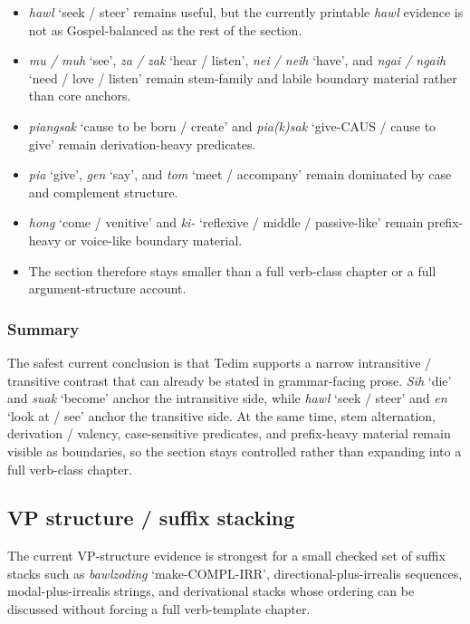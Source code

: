 \documentclass[
  11pt,
  a4paper,
]{article}
\providecommand{\tightlist}{%
  \setlength{\itemsep}{0pt}\setlength{\parskip}{0pt}}
\newcommand{\tdim}[1]{\textit{#1}}
\newcommand{\glossquote}[1]{`#1'}
\begin{document}
\begin{itemize}
\tightlist
\item
  \tdim{hawl} \glossquote{seek / steer} remains useful, but the
  currently printable \tdim{hawl} evidence is not as Gospel-balanced as
  the rest of the section.
\item
  \tdim{mu / muh} \glossquote{see}, \tdim{za / zak}
  \glossquote{hear / listen}, \tdim{nei / neih} \glossquote{have}, and
  \tdim{ngai / ngaih} \glossquote{need / love / listen} remain
  stem-family and labile boundary material rather than core anchors.
\item
  \tdim{piangsak} \glossquote{cause to be born / create} and
  \tdim{pia(k)sak} \glossquote{give-CAUS / cause to give} remain
  derivation-heavy predicates.
\item
  \tdim{pia} \glossquote{give}, \tdim{gen} \glossquote{say}, and
  \tdim{tom} \glossquote{meet / accompany} remain dominated by case and
  complement structure.
\item
  \tdim{hong} \glossquote{come / venitive} and \tdim{ki-}
  \glossquote{reflexive / middle / passive-like} remain prefix-heavy or
  voice-like boundary material.
\item
  The section therefore stays smaller than a full verb-class chapter or
  a full argument-structure account.
\end{itemize}

\subsubsection{Summary}\label{summary-4}

The safest current conclusion is that Tedim supports a narrow
intransitive / transitive contrast that can already be stated in
grammar-facing prose. \tdim{Sih} \glossquote{die} and \tdim{suak}
\glossquote{become} anchor the intransitive side, while \tdim{hawl}
\glossquote{seek / steer} and \tdim{en} \glossquote{look at / see}
anchor the transitive side. At the same time, stem alternation,
derivation / valency, case-sensitive predicates, and prefix-heavy
material remain visible as boundaries, so the section stays controlled
rather than expanding into a full verb-class chapter.

\subsection{VP structure / suffix
stacking}\label{vp-structure-suffix-stacking}

The current VP-structure evidence is strongest for a small checked set
of suffix stacks such as \tdim{bawlzoding} \glossquote{make-COMPL-IRR},
directional-plus-irrealis sequences, modal-plus-irrealis strings, and
derivational stacks whose ordering can be discussed without forcing a
full verb-template chapter.
\end{document}
